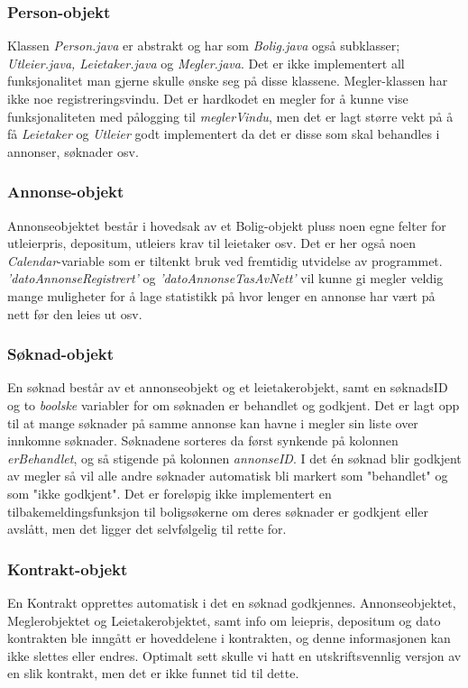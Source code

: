 \subsubsection{Person-objekt}
Klassen \emph{Person.java} er abstrakt og har som \emph{Bolig.java} også subklasser; \emph{Utleier.java, Leietaker.java} og \emph{Megler.java}.
Det er ikke implementert all funksjonalitet man gjerne skulle ønske seg på disse klassene. Megler-klassen har ikke noe registreringsvindu. Det er hardkodet en megler for å kunne vise funksjonaliteten med pålogging til \emph{meglerVindu}, men det er lagt større vekt på å få \emph{Leietaker} og \emph{Utleier} godt implementert da det er disse som skal behandles i annonser, søknader osv.

\subsubsection{Annonse-objekt}
Annonseobjektet består i hovedsak av et Bolig-objekt pluss noen egne felter for utleierpris, depositum, utleiers krav til leietaker osv.
Det er her også noen \emph{Calendar}-variable som er tiltenkt bruk ved fremtidig utvidelse av programmet. \emph{'datoAnnonseRegistrert'} og \emph{'datoAnnonseTasAvNett'} vil kunne gi megler veldig mange muligheter for å lage statistikk på hvor lenger en annonse har vært på nett før den leies ut osv. 

\subsubsection{Søknad-objekt}
En søknad består av et annonseobjekt og et leietakerobjekt, samt en søknadsID og to \emph{boolske} variabler for om søknaden er behandlet og godkjent.
Det er lagt opp til at mange søknader på samme annonse kan havne i megler sin liste over innkomne søknader. Søknadene sorteres da først synkende på kolonnen \emph{erBehandlet}, og så stigende på kolonnen \emph{annonseID}.
I det én søknad blir godkjent av megler så vil alle andre søknader automatisk bli markert som "behandlet" og som "ikke godkjent". 
Det er foreløpig ikke implementert en tilbakemeldingsfunksjon til boligsøkerne om deres søknader er godkjent eller avslått, men det ligger det selvfølgelig til rette for.

\subsubsection{Kontrakt-objekt}
En Kontrakt opprettes automatisk i det en søknad godkjennes. Annonseobjektet, Meglerobjektet og Leietakerobjektet, samt info om leiepris, depositum og dato kontrakten ble inngått er hoveddelene i kontrakten, og denne informasjonen kan ikke slettes eller endres. 
Optimalt sett skulle vi hatt en utskriftsvennlig versjon av en slik kontrakt, men det er ikke funnet tid til dette. 


